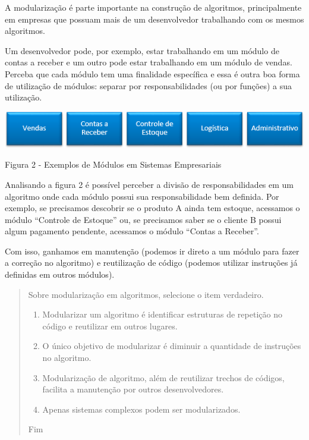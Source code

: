 \documentclass[11pt]{article}
\begin{document}
A modularização é parte importante na construção de algoritmos, principalmente em empresas que possuam mais de um desenvolvedor trabalhando com os mesmos algoritmos.

Um desenvolvedor pode, por exemplo, estar trabalhando em um módulo de contas a receber e um outro pode estar trabalhando em um módulo de vendas. Perceba que cada módulo tem uma finalidade específica e essa é outra boa forma de utilização de módulos: separar por responsabilidades (ou por funções) a sua utilização.

\begin{center}

\includegraphics[width=.9\linewidth]{figura02.png}

\caption{Figura 2 - Exemplos de Módulos em Sistemas Empresariais}

\end{center}



Analisando a figura 2 é possível perceber a divisão de responsabilidades em um algoritmo onde cada módulo possui sua responsabilidade bem definida. Por exemplo, se precisamos descobrir se o produto A ainda tem estoque, acessamos o módulo “Controle de Estoque” ou, se precisamos saber se o cliente B possui algum pagamento pendente, acessamos o módulo “Contas a Receber”.

Com isso, ganhamos em manutenção (podemos ir direto a um módulo para fazer a correção no algoritmo) e reutilização de código (podemos utilizar instruções já definidas em outros módulos).

\begin{quote}
Sobre modularização em algoritmos, selecione o item verdadeiro.
\begin{enumerate}
\item Modularizar um algoritmo é identificar estruturas de repetição no código e reutilizar em outros lugares.
\item O único objetivo de modularizar é diminuir a quantidade de instruções no algoritmo.
\item Modularização de algoritmo, além de reutilizar trechos de códigos, facilita a manutenção por outros desenvolvedores.
\item Apenas sistemas complexos podem ser modularizados.
\end{enumerate}
Fim
\end{quote}
\end{document}
